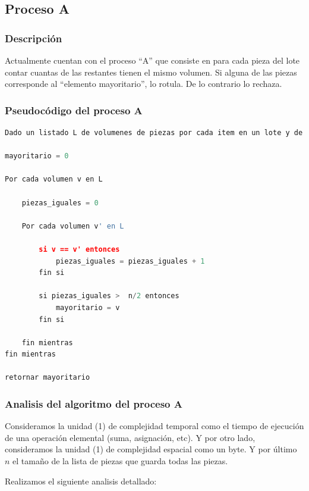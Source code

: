 \documentclass{article}
\begin{document}
\subsection{Proceso A}

\subsubsection{Descripción}
Actualmente cuentan con el proceso “A” que consiste en para cada pieza del lote contar cuantas de las restantes tienen el mismo volumen. 
Si alguna de las piezas corresponde al “elemento mayoritario”, lo rotula. De lo contrario lo rechaza.

\newpage
\subsubsection{Pseudocódigo del proceso A}

\begin{lstlisting}[language=Python, caption=Algoritmo del proceso A]
Dado un listado L de volumenes de piezas por cada item en un lote y de n elementos.

mayoritario = 0

Por cada volumen v en L
    
    piezas_iguales = 0

    Por cada volumen v' en L

        si v == v' entonces 
            piezas_iguales = piezas_iguales + 1
        fin si

        si piezas_iguales >  n/2 entonces
            mayoritario = v
        fin si

    fin mientras
fin mientras

retornar mayoritario

\end{lstlisting}

\subsubsection{Analisis del algoritmo del proceso A}

Consideramos la unidad (1) de complejidad temporal como el tiempo de ejecución de una operación elemental (suma, asignación, etc). 
Y por otro lado, consideramos la unidad (1) de complejidad espacial como un byte. Y por último \(n\) el tamaño de la lista de piezas que guarda todas las piezas.

Realizamos el siguiente analisis detallado:
\end{document}

